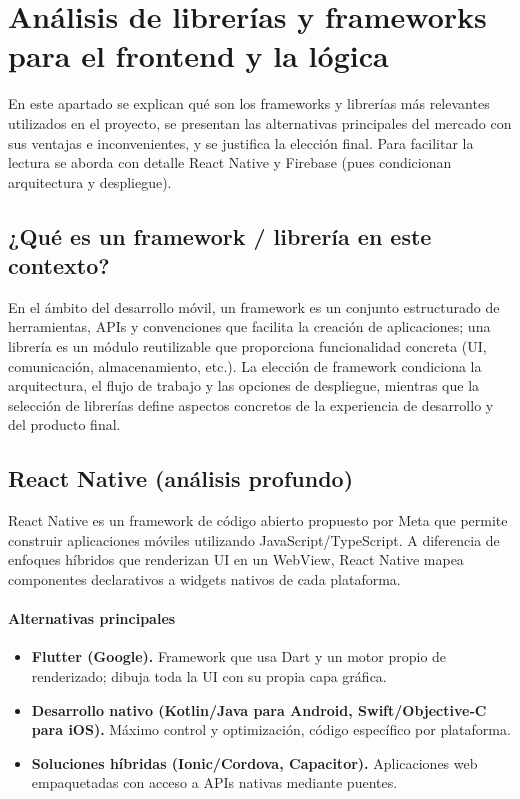 \documentclass[twoside, openright, 11pt]{report}
\begin{document}
	\section{Análisis de librerías y frameworks para el frontend y la lógica}
	En este apartado se explican qué son los frameworks y librerías más relevantes utilizados en el proyecto, se presentan las alternativas principales del mercado con sus ventajas e inconvenientes, y se justifica la elección final. Para facilitar la lectura se aborda con detalle React Native y Firebase (pues condicionan arquitectura y despliegue).
	
	\subsection{¿Qué es un framework / librería en este contexto?}
	En el ámbito del desarrollo móvil, un framework es un conjunto estructurado de herramientas, APIs y convenciones que facilita la creación de aplicaciones; una librería es un módulo reutilizable que proporciona funcionalidad concreta (UI, comunicación, almacenamiento, etc.). La elección de framework condiciona la arquitectura, el flujo de trabajo y las opciones de despliegue, mientras que la selección de librerías define aspectos concretos de la experiencia de desarrollo y del producto final.
	
	\subsection{React Native (análisis profundo)}
	React Native es un framework de código abierto propuesto por Meta que permite construir aplicaciones móviles utilizando JavaScript/TypeScript. A diferencia de enfoques híbridos que renderizan UI en un WebView, React Native mapea componentes declarativos a widgets nativos de cada plataforma.
	
	\paragraph{Alternativas principales}
	\begin{itemize}
		\item \textbf{Flutter (Google).} Framework que usa Dart y un motor propio de renderizado; dibuja toda la UI con su propia capa gráfica.
		\item \textbf{Desarrollo nativo (Kotlin/Java para Android, Swift/Objective‑C para iOS).} Máximo control y optimización, código específico por plataforma.
		\item \textbf{Soluciones híbridas (Ionic/Cordova, Capacitor).} Aplicaciones web empaquetadas con acceso a APIs nativas mediante puentes.
	\end{itemize}
	
\end{document}
